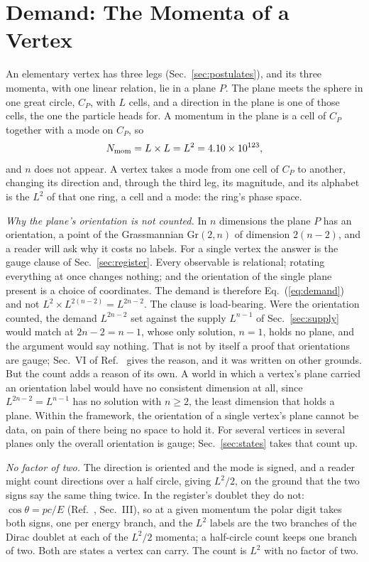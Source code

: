 \documentclass[aps,prd,twocolumn,superscriptaddress,nofootinbib]{revtex4-2}
\begin{document}
\section{Demand: The Momenta of a Vertex}
\label{sec:demand}

An elementary vertex has three legs (Sec.~\ref{sec:postulates}), and its three momenta, with one linear relation, lie in a plane $P$. The plane meets the sphere in one great circle, $C_P$, with $L$ cells, and a direction in the plane is one of those cells, the one the particle heads for. A momentum in the plane is a cell of $C_P$ together with a mode on $C_P$, so
\begin{equation}
N_{\rm mom} = L\times L = L^2 = 4.10\times10^{123},
\label{eq:demand}
\end{equation}
and $n$ does not appear. A vertex takes a mode from one cell of $C_P$ to another, changing its direction and, through the third leg, its magnitude, and its alphabet is the $L^2$ of that one ring, a cell and a mode: the ring's phase space.

\textit{Why the plane's orientation is not counted.} In $n$ dimensions the plane $P$ has an orientation, a point of the Grassmannian $\mathrm{Gr}(2,n)$ of dimension $2(n-2)$, and a reader will ask why it costs no labels. For a single vertex the answer is the gauge clause of Sec.~\ref{sec:register}. Every observable is relational; rotating everything at once changes nothing; and the orientation of the single plane present is a choice of coordinates. The demand is therefore Eq.~(\ref{eq:demand}) and not $L^2\times L^{2(n-2)} = L^{2n-2}$. The clause is load-bearing. Were the orientation counted, the demand $L^{2n-2}$ set against the supply $L^{n-1}$ of Sec.~\ref{sec:supply} would match at $2n-2 = n-1$, whose only solution, $n = 1$, holds no plane, and the argument would say nothing. That is not by itself a proof that orientations are gauge; Sec.~VI of Ref.~\cite{korytko2026c} gives the reason, and it was written on other grounds. But the count adds a reason of its own. A world in which a vertex's plane carried an orientation label would have no consistent dimension at all, since $L^{2n-2} = L^{n-1}$ has no solution with $n \ge 2$, the least dimension that holds a plane. Within the framework, the orientation of a single vertex's plane cannot be data, on pain of there being no space to hold it. For several vertices in several planes only the overall orientation is gauge; Sec.~\ref{sec:states} takes that count up.

\textit{No factor of two.} The direction is oriented and the mode is signed, and a reader might count directions over a half circle, giving $L^2/2$, on the ground that the two signs say the same thing twice. In the register's doublet they do not: $\cos\theta = pc/E$ (Ref.~\cite{korytko2026c}, Sec.~III), so at a given momentum the polar digit takes both signs, one per energy branch, and the $L^2$ labels are the two branches of the Dirac doublet at each of the $L^2/2$ momenta; a half-circle count keeps one branch of two. Both are states a vertex can carry. The count is $L^2$ with no factor of two.
\end{document}
